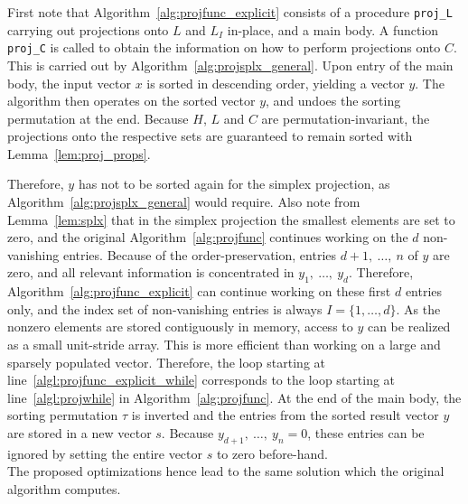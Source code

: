 \documentclass[twoside,11pt]{article}
\newenvironment{proofof}[1][Proof]{\par\noindent{\bf #1\ }}{\hfill\BlackBox\\[2mm]}
\newcommand{\0}{\mathcal{O}}
\newcommand{\discint}[2]{\{#1,\dotsc,#2\}}
\begin{document}
\begin{proofof}[Proof of Theorem~\ref{thm:projfunc_improved}]
First note that Algorithm~\ref{alg:projfunc_explicit} consists of a procedure {\tt proj\_L} carrying out projections onto $L$ and $L_I$ in-place, and a main body.
A function {\tt proj\_C} is called to obtain the information on how to perform projections onto $C$.
This is carried out by Algorithm~\ref{alg:projsplx_general}.
Upon entry of the main body, the input vector $x$ is sorted in descending order, yielding a vector $y$.
The algorithm then operates on the sorted vector $y$, and undoes the sorting permutation at the end.
Because $H$, $L$ and $C$ are permutation-invariant, the projections onto the respective sets are guaranteed to remain sorted with Lemma~\ref{lem:proj_props}.

Therefore, $y$ has not to be sorted again for the simplex projection, as Algorithm~\ref{alg:projsplx_general} would require.
Also note from Lemma~\ref{lem:splx} that in the simplex projection the smallest elements are set to zero, and the original Algorithm~\ref{alg:projfunc} continues working on the $d$ non-vanishing entries.
Because of the order-preservation, entries $d+1,\ \dotsc,\ n$ of $y$ are zero, and all relevant information is concentrated in $y_1,\ \dotsc,\ y_d$.
Therefore, Algorithm~\ref{alg:projfunc_explicit} can continue working on these first $d$ entries only, and the index set of non-vanishing entries is always $I = \discint{1}{d}$.
As the nonzero elements are stored contiguously in memory, access to $y$ can be realized as a small unit-stride array.
This is more efficient than working on a large and sparsely populated vector.
Therefore, the loop starting at line~\ref{algl:projfunc_explicit_while} corresponds to the loop starting at line~\ref{algl:projwhile} in Algorithm~\ref{alg:projfunc}.
At the end of the main body, the sorting permutation $\tau$ is inverted and the entries from the sorted result vector $y$ are stored in a new vector $s$.
Because $y_{d+1},\ \dotsc,\ y_n = 0$, these entries can be ignored by setting the entire vector $s$ to zero before-hand.
\end{proofof}
The proposed optimizations hence lead to the same solution which the original algorithm computes.
\end{document}
